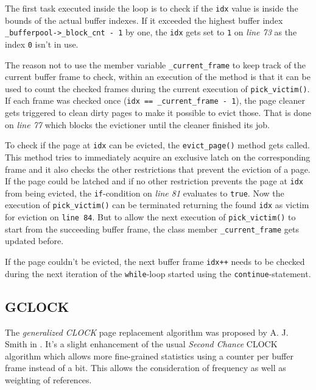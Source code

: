     The first task executed inside the loop is to check if the \lstinline{idx} value is inside the bounds of the actual buffer indexes. If it exceeded the highest buffer index \lstinline{_bufferpool->_block_cnt - 1} by one, the \lstinline{idx} gets set to \lstinline{1} on \emph{line 73} as the index \lstinline{0} isn't in use.

    The reason not to use the member variable \lstinline{_current_frame} to keep track of the current buffer frame to check, within an execution of the method is that it can be used to count the checked frames during the current execution of \lstinline{pick_victim()}. If each frame was checked once (\lstinline{idx == _current_frame - 1}), the page cleaner gets triggered to clean dirty pages to make it possible to evict those. That is done on \emph{line 77} which blocks the evictioner until the cleaner finished its job.

    To check if the page at \lstinline{idx} can be evicted, the \lstinline{evict_page()} method gets called. This method tries to immediately acquire an exclusive latch on the corresponding frame and it also checks the other restrictions that prevent the eviction of a page. If the page could be latched and if no other restriction prevents the page at \lstinline{idx} from being evicted, the \lstinline{if}-condition on \emph{line 81} evaluates to \lstinline{true}. Now the execution of \lstinline{pick_victim()} can be terminated returning the found \lstinline{idx} as victim for eviction on \lstinline{line 84}. But to allow the next execution of \lstinline{pick_victim()} to start from the succeeding buffer frame, the class member \lstinline{_current_frame} gets updated before.

    If the page couldn't be evicted, the next buffer frame \lstinline{idx++} needs to be checked during the next iteration of the \lstinline{while}-loop started using the \lstinline{continue}-statement.

\subsection{GCLOCK} \label{subsec:gclock}

    The \emph{generalized CLOCK} page replacement algorithm was proposed by A. J. Smith in \cite{Smith:1978}. It's a slight enhancement of the usual \emph{Second Chance} CLOCK algorithm which allows more fine-grained statistics using a counter per buffer frame instead of a bit. This allows the consideration of frequency as well as weighting of references.

